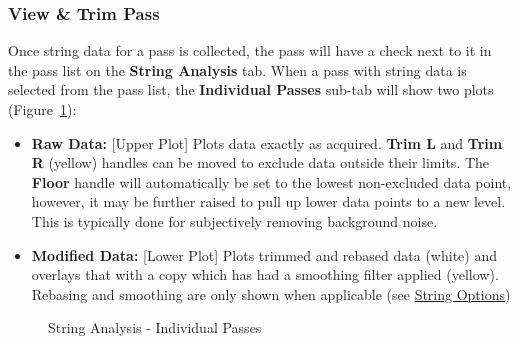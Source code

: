 \documentclass[10pt,letterpaper,titlepage]{article}
\begin{document}
    \subsubsection{View \& Trim Pass}
    Once string data for a pass is collected, the pass will have a check next to it in the pass list on the \textbf{String Analysis} tab. When a pass with string data is selected from the pass list, the \textbf{Individual Passes} sub-tab will show two plots (Figure~\ref{fig:string_individual}): 
    \begin{itemize}
        \item \textbf{Raw Data:} [Upper Plot] Plots data exactly as acquired. \textbf{Trim L} and \textbf{Trim R} (yellow) handles can be moved to exclude data outside their limits. The \textbf{Floor} handle will automatically be set to the lowest non-excluded data point, however, it may be further raised to pull up lower data points to a new level. This is typically done for subjectively removing background noise.
        \item \textbf{Modified Data:} [Lower Plot] Plots trimmed and rebased data (white) and overlays that with a copy which has had a smoothing filter applied (yellow). Rebasing and smoothing are only shown when applicable (see \hyperref[sec:string_options]{String Options})
    \end{itemize}
    \begin{figure}[h]
        \centering
        \caption{String Analysis - Individual Passes}
        \label{fig:string_individual}
    \end{figure}
    \newpage
\end{document}
